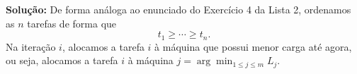\noindent \textbf{Solução:}
De forma análoga ao enunciado do Exercício 4 da Lista 2, ordenamos as $n$ tarefas de forma que
\[t_{1} \ge \cdots \ge t_{n}.\]
Na iteração $i$, alocamos a tarefa $i$ à máquina que possui menor carga até agora, ou seja, alocamos a tarefa $i$ à máquina $j = \arg\min_{1 \le j \le m} L_j$.
